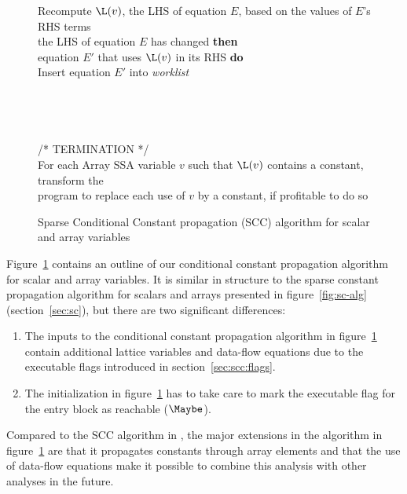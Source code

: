 \begin{figure}
\begin{center}
\begin{programa}
\Tb Recompute $\L(v)$, the LHS of equation $E$, based on the values of $E$'s RHS terms\\
 the LHS of equation $E$ has changed {\bf then}\\
 equation $E'$ that uses $\L(v)$ in its RHS {\bf do}\\
\Td Insert equation $E'$ into {\it worklist}\\
\\
\\
 \\
\\
/* TERMINATION */\\
\Ta For each Array SSA variable $v$ such that $\L(v)$ contains a constant, transform the \\ 
\Ta program to replace each use of $v$ by a constant, if profitable to do so
\end{programa}
\end{center}
\caption{Sparse Conditional Constant propagation (SCC) algorithm for scalar and array variables}
\label{fig:scc-alg}
\end{figure}

Figure~\ref{fig:scc-alg} contains an outline of our conditional constant
propagation algorithm for scalar and array variables.  It is similar in
structure to the sparse constant propagation algorithm for scalars
and arrays presented in figure~\ref{fig:sc-alg} (section~\ref{sec:sc}),
but there are two significant differences:
\begin{enumerate}
\item The inputs to the conditional constant propagation algorithm
in figure~\ref{fig:scc-alg}
contain additional lattice variables and data-flow equations due
to the executable flags introduced in section~\ref{sec:scc:flags}.
\item The initialization in figure~\ref{fig:scc-alg}
has to take care to mark the executable flag for the entry 
block as reachable ($\Maybe$).
\end{enumerate}
Compared to the SCC algorithm in \cite{WeZa91}, the major extensions in
the algorithm in figure~\ref{fig:scc-alg} are that it propagates constants
through array elements and that the use of data-flow equations make
it possible to combine this analysis with other analyses in the future.


